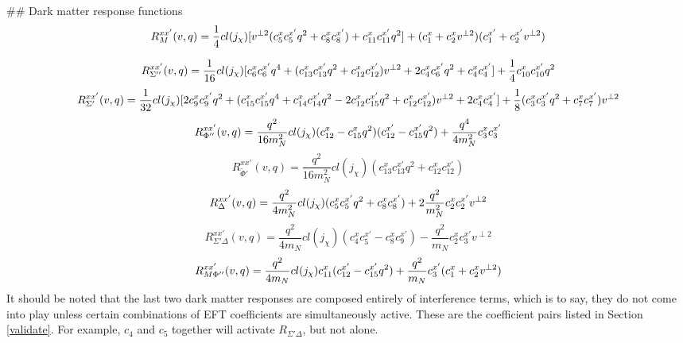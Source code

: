 ## Dark matter response functions
\begin{equation}
   R_{M}^{xx'}(v,q) = \frac{1}{4}cl(j_\chi) [ v^{\perp 2} (c_5^{x}c_5^{x'}q^2 + c_8^{x}c_8^{x'}) + c_{11}^{x}c_{11}^{x'}q^2 ]\\
    + (c_1^{x} + c_2^{x}v^{\perp 2} ) (c_1^{x'} + c_2^{x'}v^{\perp 2} )  
\end{equation}
 
\begin{equation}             
R_{\Sigma''}^{xx'}(v,q) = \frac{1}{16}cl(j_\chi) [c_6^{x}c_6^{x'}q^4 + (c_{13}^{x}c_{13}^{x'}q^2 + c_{12}^{x} c_{12}^{x'} ) v^{\perp 2}\\
    + 2c_4^xc_6^{x'}q^2 + c_4^xc_4^{x'}] + \frac{1}{4}c_{10}^xc_{10}^{x '}q^2
\end{equation}    
\begin{equation}    
R_{\Sigma'}^{xx'}(v,q) = \frac{1}{32} cl(j_\chi) [ 2c_{9}^{x}c_{9}^{x'}q^2 + ( c_{15}^{x}c_{15}^{x'}q^4 + c_{14}^{x}c_{14}^{x'}q^2 \\
    - 2c_{12}^{x}c_{15}^{x'} q^2 + c_{12}^{x}c_{12}^{x'}) v^{\perp 2} + 2c_{4}^{x}c_{4}^{x'} ]\\
    +\frac{1}{8}(c_{3}^{x}c_3^{x'}q^2 + c_{7}^{x}c_{7}^{x'})v^{\perp 2}
\end{equation}        
\begin{equation}        
R_{\Phi''}^{xx'}(v,q) = \frac{q^2}{16m_N^2}cl(j_\chi) (c_{12}^x - c_{15}^{x}q^2)(c_{12}^{x '}-c_{15}^{x '}q^2 ) \\
    + \frac{q^4}{4m_N^2}c_3^x c_3^{x'} 
\end{equation}    
\begin{equation}    
R_{\tilde{\Phi}'}^{xx'}(v,q) = \frac{q^2}{16m_N^2}cl(j_\chi)(c_{13}^xc_{13}^{x'}q^2 + c_{12}^x c_{12}^{x'})
\end{equation}        
\begin{equation}        
R_{\Delta}^{xx'}(v,q) = \frac{q^2}{4m_N^2}cl(j_\chi) (c_{5}^{x}c_{5}^{x'}q^2 + c_{8}^{x}c_{8}^{x'}) \\
    + 2\frac{q^2}{m_N^2}c_{2}^{x}c_{2}^{x'}v^{\perp 2}
\end{equation}        
\begin{equation}        
R_{\Sigma' \Delta}^{xx'}(v,q) = \frac{q^2}{4m_N}cl(j_\chi) (c_{4}^{x}c_{5}^{x'} - c_{8}^{x}c_{9}^{x'}) - \frac{q^2}{m_N} c_{2}^{x}c_{3}^{x'} v^{\perp 2}
\end{equation}        
\begin{equation}        
R_{M\Phi''}^{xx'}(v,q) = \frac{q^2}{4m_N}cl(j_\chi)c_{11}^{x} (c_{12}^{x'} - c_{15}^{x'} q^2) \\
    + \frac{q^2}{m_N}c_{3}^{x'}  (c_{1}^{x} + c_{2}^{x} v^{\perp 2})
\end{equation}        
It should be noted that the last two dark matter responses are composed entirely of interference terms, which is to say, they do not come into play unless certain combinations  of EFT coefficients are simultaneously active. These are the coefficient pairs listed in Section \ref{validate}. For example, $c_4$ and $c_5$ together will activate $R_{\Sigma' \Delta}$, but not alone.

